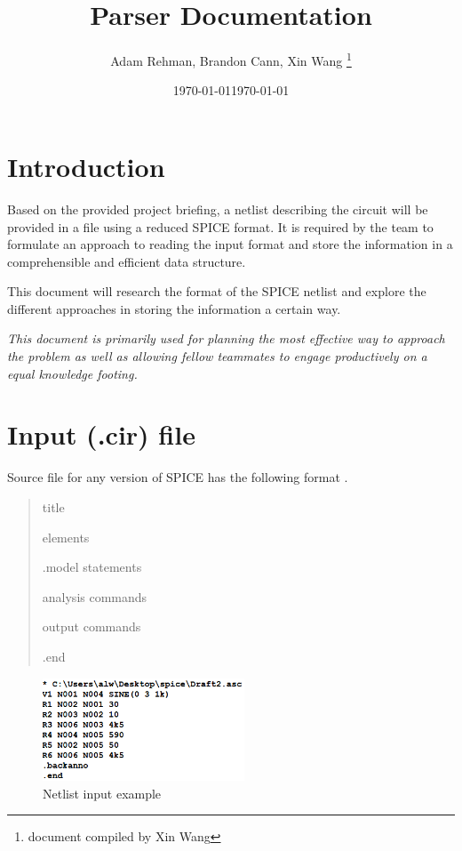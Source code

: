 \documentclass[a4paper, titlepage]{article}
\title{Parser Documentation}
\author{Adam Rehman, Brandon Cann, Xin Wang \thanks{document compiled by Xin Wang}}
\date \today
\date{\today}
\begin{document}
    \maketitle
    
    \tableofcontents
    \pagebreak
 
    \section{Introduction}
    \indent
    Based on the provided project briefing, a netlist describing the circuit will be provided in a file 
    using a reduced SPICE format. It is required by the team to formulate an approach to reading the input format and 
    store the information in a comprehensible and efficient data structure. 
    \par
    This document will research the format of the SPICE netlist and explore the different approaches in 
    storing the information a certain way. 
    \vfill
    \begin{center}
        \textit{This document is primarily used for planning the most effective 
        way to approach the problem as well as allowing fellow teammates to 
        engage productively on a equal knowledge footing.}
    \end{center}
    \pagebreak
    \section{Input (.cir) file}
    Source file for any version of SPICE has the following format \cite{spice}.
    \begin{quotation}
        {\selectfont
            title \par
            elements \par
            .model statements \par
            analysis commands \par
            output commands \par
            .end \par
        }
    \end{quotation}

    \begin{figure}[h]
        \centering
        \includegraphics[width=60mm,scale=1]{spice netlist example}
        \caption{Netlist input example}
        \label{fig:Netlist input example}
    \end{figure}
\end{document}
